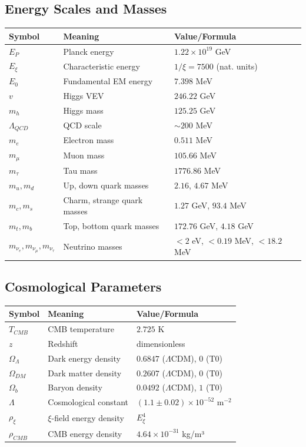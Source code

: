 \documentclass[12pt,a4paper]{report}
\begin{document}
\subsection{Energy Scales and Masses}
\begin{longtable}{lll}
	\toprule
	\textbf{Symbol} & \textbf{Meaning} & \textbf{Value/Formula} \\
	\midrule
	$E_P$ & Planck energy & $1.22 \times 10^{19}$ GeV \\
	$E_\xi$ & Characteristic energy & $1/\xi = 7500$ (nat. units) \\
	$E_0$ & Fundamental EM energy & $7.398$ MeV \\
	$v$ & Higgs VEV & $246.22$ GeV \\
	$m_h$ & Higgs mass & $125.25$ GeV \\
	$\Lambda_{QCD}$ & QCD scale & $\sim 200$ MeV \\
	$m_e$ & Electron mass & $0.511$ MeV \\
	$m_\mu$ & Muon mass & $105.66$ MeV \\
	$m_\tau$ & Tau mass & $1776.86$ MeV \\
	$m_u, m_d$ & Up, down quark masses & $2.16$, $4.67$ MeV \\
	$m_c, m_s$ & Charm, strange quark masses & $1.27$ GeV, $93.4$ MeV \\
	$m_t, m_b$ & Top, bottom quark masses & $172.76$ GeV, $4.18$ GeV \\
	$m_{\nu_e}, m_{\nu_\mu}, m_{\nu_\tau}$ & Neutrino masses & $< 2$ eV, $< 0.19$ MeV, $< 18.2$ MeV \\
	\bottomrule
\end{longtable}
\normalsize

\subsection{Cosmological Parameters}
\begin{longtable}{lll}
	\toprule
	\textbf{Symbol} & \textbf{Meaning} & \textbf{Value/Formula} \\
	\midrule
	$T_{CMB}$ & CMB temperature & $2.725$ K \\
	$z$ & Redshift & dimensionless \\
	$\Omega_\Lambda$ & Dark energy density & $0.6847$ ($\Lambda$CDM), $0$ (T0) \\
	$\Omega_{DM}$ & Dark matter density & $0.2607$ ($\Lambda$CDM), $0$ (T0) \\
	$\Omega_b$ & Baryon density & $0.0492$ ($\Lambda$CDM), $1$ (T0) \\
	$\Lambda$ & Cosmological constant & $(1.1 \pm 0.02) \times 10^{-52}$ m$^{-2}$ \\
	$\rho_\xi$ & $\xi$-field energy density & $E_\xi^4$ \\
	$\rho_{CMB}$ & CMB energy density & $4.64 \times 10^{-31}$ kg/m³ \\
	\bottomrule
\end{longtable}
\normalsize
\end{document}
